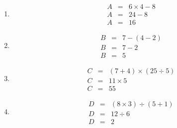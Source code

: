 	\begin{multicols}{2}
		\begin{enumerate}[label=\alph*.]
			
			\item \begin{eqnarray*}
				A &=& 6 \times 4  - 8\\
				A &=& 24 - 8 \\
				A &=& 16
			\end{eqnarray*}
			
			\item \begin{eqnarray*}
				B &=& 7 - (4 - 2)\\
				B &=& 7 - 2\\
				B &=& 5
			\end{eqnarray*}
			
			\item \begin{eqnarray*}
				C &=& (7 + 4) \times (25 \div 5) \\
				C &=& 11 \times 5 \\
				C &=& 55
			\end{eqnarray*}
		
			\item \begin{eqnarray*}
				D &=& (8 \times 3) \div (5 + 1) \\
				D &=& 12 \div 6 \\
				D &=& 2
			\end{eqnarray*}
			
		\end{enumerate}
	\end{multicols}
